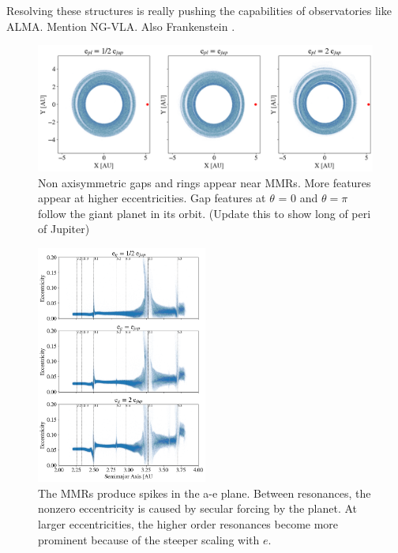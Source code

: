 \documentclass[onecolumn]{aastex63}
\begin{document}
Resolving these structures is really pushing the capabilities of observatories like ALMA. Mention NG-VLA. Also {\sc Frankenstein} \citep{2020arXiv200507709J}.

\begin{figure}
\begin{center}
    \includegraphics[width=\textwidth]{figures/xy.png}
    \caption{Non axisymmetric gaps and rings appear near MMRs. More features appear at higher eccentricities. Gap features
    at $\theta$ = 0 and $\theta = \pi$ follow the giant planet in its orbit. (Update this to show long of peri of Jupiter)\label{fig:xy}}
\end{center}
\end{figure}

\begin{figure}
\begin{center}
    \includegraphics[width=0.5\textwidth]{figures/ae.png}
    \caption{The MMRs produce spikes in the a-e plane. Between resonances, the nonzero eccentricity is caused by secular
    forcing by the planet. At larger eccentricities, the higher order resonances become more prominent because of the steeper
    scaling with $e$.\label{fig:ae}}
\end{center}
\end{figure}
\end{document}
